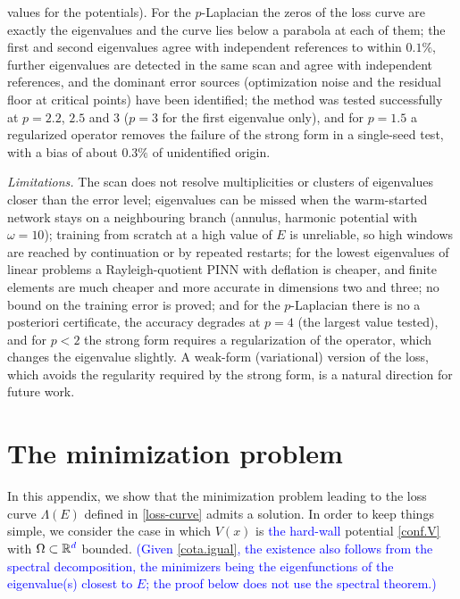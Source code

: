 \documentclass[10pt]{amsart}
\newcommand{\rev}[1]{\textcolor{blue}{#1}}
\newenvironment{revblock}{\color{blue}}{}
\theoremstyle{definition}
\theoremstyle{remark}
\theoremstyle{plain}
\newcommand{\R}{\mathbb{R}}
\begin{document}
\begin{revblock}
values for the potentials). For the $p$-Laplacian the zeros of the loss curve are exactly the
eigenvalues and the curve lies below a parabola at each of them; the first and second eigenvalues
agree with independent references to within $0.1\%$, further eigenvalues are detected in the same
scan and agree with independent references, and the dominant error sources (optimization noise and
the residual floor at critical points) have been identified; the method was tested successfully at
$p=2.2$, $2.5$ and $3$ ($p=3$ for the first eigenvalue only), and for $p=1.5$ a regularized operator removes the failure of the strong form in a
single-seed test, with a bias of about $0.3\%$ of unidentified origin.

\emph{Limitations.} The scan does not resolve multiplicities or clusters of eigenvalues closer than
the error level; eigenvalues can be missed when the warm-started network stays on a neighbouring branch
(annulus, harmonic potential with $\omega=10$); training from scratch at a high value of $E$ is
unreliable, so high windows are reached by continuation or by repeated restarts; for the lowest
eigenvalues of linear problems a Rayleigh-quotient PINN with deflation is cheaper, and finite elements
are much cheaper and more accurate in dimensions two and three; no bound on the training error
is proved; and for the $p$-Laplacian there is no a posteriori certificate, the accuracy degrades at
$p=4$ (the largest value tested), and for $p<2$ the strong form requires a regularization of the operator, which changes the
eigenvalue slightly. A weak-form (variational) version
of the loss, which avoids the regularity required by the strong form, is a natural direction for
future work.
\end{revblock}

\appendix

\section{The minimization problem}

In this appendix, we show that the minimization problem leading to the loss curve $\Lambda(E)$ defined in \eqref{loss-curve} admits a solution. In order to keep things simple, we consider the case in which $V(x)$ is \rev{the hard-wall} potential \eqref{conf.V} with $\Omega\subset \R^{\rev{d}}$ bounded. \rev{(Given \eqref{cota.igual}, the existence also follows from the spectral decomposition, the minimizers being the eigenfunctions of the eigenvalue(s) closest to $E$; the proof below does not use the spectral theorem.)}
\end{document}
